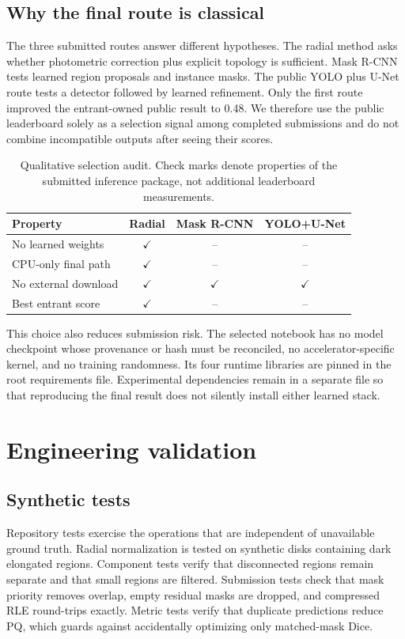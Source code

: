 \documentclass[sigconf]{acmart}
\begin{document}
\subsection{Why the final route is classical}
The three submitted routes answer different hypotheses. The radial method asks
whether photometric correction plus explicit topology is sufficient. Mask R-CNN
tests learned region proposals and instance masks. The public YOLO plus U-Net
route tests a detector followed by learned refinement. Only the first route
improved the entrant-owned public result to 0.48. We therefore use the public
leaderboard solely as a selection signal among completed submissions and do not
combine incompatible outputs after seeing their scores.

\begin{table}[h]
\caption{Qualitative selection audit. Check marks denote properties of the
submitted inference package, not additional leaderboard measurements.}
\label{tab:audit}
\centering
\small
\begin{tabular}{@{}lccc@{}}
\toprule
Property & Radial & Mask R-CNN & YOLO+U-Net \\
\midrule
No learned weights & $\checkmark$ & -- & -- \\
CPU-only final path & $\checkmark$ & -- & -- \\
No external download & $\checkmark$ & $\checkmark$ & $\checkmark$ \\
Best entrant score & $\checkmark$ & -- & -- \\
\bottomrule
\end{tabular}
\end{table}

This choice also reduces submission risk. The selected notebook has no model
checkpoint whose provenance or hash must be reconciled, no accelerator-specific
kernel, and no training randomness. Its four runtime libraries are pinned in the
root requirements file. Experimental dependencies remain in a separate file so
that reproducing the final result does not silently install either learned stack.

\section{Engineering validation}
\subsection{Synthetic tests}
Repository tests exercise the operations that are independent of unavailable
ground truth. Radial normalization is tested on synthetic disks containing dark
elongated regions. Component tests verify that disconnected regions remain
separate and that small regions are filtered. Submission tests check that mask
priority removes overlap, empty residual masks are dropped, and compressed RLE
round-trips exactly. Metric tests verify that duplicate predictions reduce PQ,
which guards against accidentally optimizing only matched-mask Dice.
\end{document}
